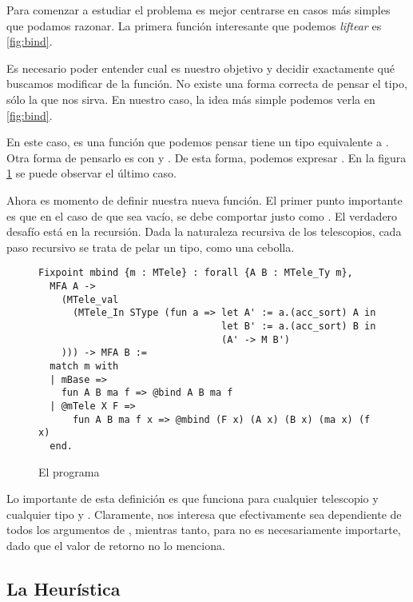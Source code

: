 Para comenzar a estudiar el problema es mejor centrarse en casos más simples que
podamos razonar. La primera función interesante que podemos \textit{liftear} es
 \ref{fig:bind}. 

Es necesario poder entender cual es nuestro objetivo y decidir exactamente qué
buscamos modificar de la función. No existe una forma correcta de pensar el
tipo, sólo la que nos sirva. En nuestro caso, la idea más simple podemos verla
en \ref{fig:bind}.

En este caso,  es una función que podemos pensar tiene un
tipo equivalente a . Otra forma
de pensarlo es con  y . De esta forma, podemos
expresar . En la figura
\ref{fig:mbind} se puede observar el último caso. 

Ahora es momento de definir nuestra nueva función. El primer punto importante es
que en el caso de que  sea vacío,  se debe comportar justo
como . El verdadero desafío está en la recursión. Dada la naturaleza
recursiva de los telescopios, cada paso recursivo se trata de pelar un tipo,
como una cebolla.

\begin{figure}[h]
\centering
\begin{verbatim}
Fixpoint mbind {m : MTele} : forall {A B : MTele_Ty m},
  MFA A ->
    (MTele_val
      (MTele_In SType (fun a => let A' := a.(acc_sort) A in
                                let B' := a.(acc_sort) B in
                                (A' -> M B')
    ))) -> MFA B :=
  match m with
  | mBase =>
    fun A B ma f => @bind A B ma f
  | @mTele X F =>
      fun A B ma f x => @mbind (F x) (A x) (B x) (ma x) (f x)
  end.
\end{verbatim}
\caption{El programa }
\label{fig:mbind}
\end{figure}

Lo importante de esta definición es que funciona para cualquier telescopio y
cualquier tipo  y . Claramente, nos interesa que 
efectivamente sea dependiente de todos los argumentos de , mientras
tanto, para  no es necesariamente importarte, dado que el valor de
retorno no lo menciona.

\subsection{La Heurística}

